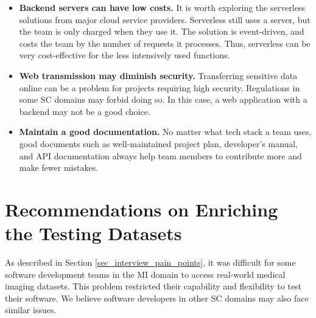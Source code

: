 \begin{itemize}
\item \textbf{Backend servers can have low costs.} It is worth exploring the serverless solutions from major cloud service providers. Serverless still uses a server, but the team is only charged when they use it. The solution is event-driven, and costs the team by the number of requests it processes. Thus, serverless can be very cost-effective for the less intensively used functions.

\item \textbf{Web transmission may diminish security.} Transferring sensitive data online can be a problem for projects requiring high security. Regulations in some SC domains may forbid doing so. In this case, a web application with a backend may not be a good choice.

\item \textbf{Maintain a good documentation.} No matter what tech stack a team uses, good documents such as well-maintained project plan, developer's manual, and API documentation always help team members to contribute more and make fewer mistakes.
\end{itemize}

\section{Recommendations on Enriching the Testing Datasets}
\label{sec_recommendations_testing_dataset}

As described in Section \ref{sec_interview_pain_points}, it was difficult for some software development teams in the MI domain to access real-world medical imaging datasets. This problem restricted their capability and flexibility to test their software. We believe software developers in other SC domains may also face similar issues.

